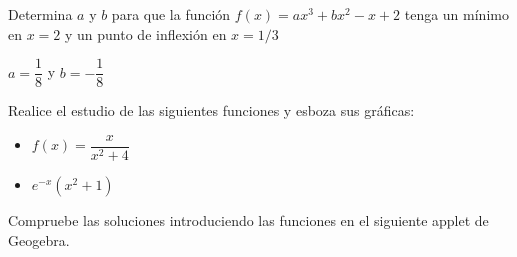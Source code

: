 \vspace{1cm}



\begin{ex}
	Determina $a$ y $b$ para que la función $f(x) = ax^3+bx^2-x+2$ tenga un mínimo en $x=2$ y un punto de inflexión en $x=1/3$
	\begin{sol}
		$a=\dfrac{1}{8}$ y $b=- \dfrac{1}{8}$
	\end{sol}
\end{ex}

\vspace{1cm}



\begin{ex}
	Realice el estudio de las siguientes funciones y esboza sus gráficas:
	\begin{itemize}
		\item $f(x) = \dfrac{x}{x^2+4}$
		\item $e^{-x}(x^2+1)$
	\end{itemize}
	\begin{sol}
		Compruebe las soluciones introduciendo las funciones en el siguiente applet de Geogebra.
	\end{sol}
\end{ex}
